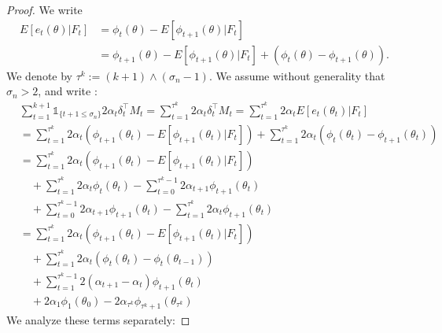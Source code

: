 \documentclass[11pt]{article}
\begin{document}
\begin{proof}
 We write 
 \begin{align*}
E[e_t(\theta)|F_t]& = \phi_t(\theta)- E[\phi_{t+1}(\theta)|F_t]\\
&= \phi_{t+1}(\theta) - E[\phi_{t+1}(\theta)|F_t] + \left(\phi_t(\theta) - \phi_{t+1}(\theta)\right).
\end{align*}
We denote by $\tau^k:=(k+1) \wedge (\sigma_n-1)$.
We assume without generality that $\sigma_n>2$, and write :
\begin{align*}
&\sum_{t=1}^{k+1} \mathds{1}_{\{t+1\leq \sigma_n\}}2\alpha_t \delta_t^\intercal M_t  = \sum_{t=1}^{\tau^k} 2\alpha_t \delta_t^\intercal M_t  = \sum_{t=1}^{\tau^k}2\alpha_t E[e_t(\theta_t)|F_t]\\
& = \sum_{t=1}^{\tau^k}2\alpha_t \left(\phi_{t+1}(\theta_t)-E[\phi_{t+1}(\theta_t)|F_t]\right) + \sum_{t=1}^{\tau^k}2\alpha_t \left(\phi_t(\theta_t) - \phi_{t+1}(\theta_t)\right)\\
& = \sum_{t=1}^{\tau^k}2\alpha_t \left(\phi_{t+1}(\theta_t)-E[\phi_{t+1}(\theta_t)|F_t]\right) \\
& \quad+  \sum_{t=1}^{\tau^k} 2\alpha_t \phi_t(\theta_t) - \sum_{t=0}^{\tau^k-1} 2\alpha_{t+1} \phi_{t+1}(\theta_t)\\
& \quad +  \sum_{t=0}^{\tau^k-1}2\alpha_{t+1} \phi_{t+1}(\theta_t) -   \sum_{t=1}^{\tau^k} 2\alpha_t \phi_{t+1}(\theta_t) \\
& = \sum_{t=1}^{\tau^k}2\alpha_t \left(\phi_{t+1}(\theta_t)-E[\phi_{t+1}(\theta_t)|F_t]\right) \\
&\quad + \sum_{t=1}^{\tau^k} 2\alpha_t \left( \phi_t(\theta_t) -\phi_t(\theta_{t-1}) \right)\\
&\quad +  \sum_{t=1}^{\tau^k-1}2(\alpha_{t+1}-\alpha_t) \phi_{t+1}(\theta_t) \\
&\quad + 2\alpha_1 \phi_1(\theta_0) - 2\alpha_{\tau^k} \phi_{\tau^k+1}(\theta_{\tau^k}) 
\end{align*}
We analyze these terms separately:


\end{proof}
\end{document}
